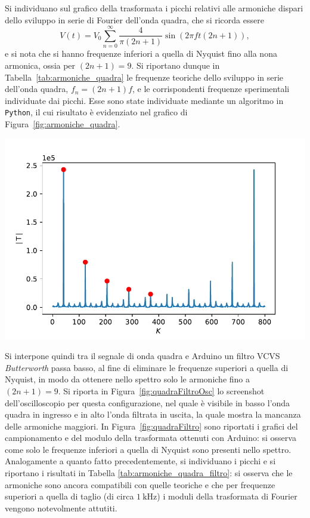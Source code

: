 \documentclass[10pt,oneside,a4paper]{article}
\newenvironment{Figure}
  {\par\medskip\noindent\minipage{\linewidth}}
  {\endminipage\par\medskip}
\begin{document}
\begin{multicols}{2}
Si individuano sul grafico della trasformata i picchi relativi alle armoniche dispari dello sviluppo in serie di Fourier dell'onda quadra, che si ricorda essere
\[
V(t) = V_0 \sum_{n=0}^{\infty} \frac{4}{\pi(2n+1)} \sin(2\pi f t(2n+1)), 
\]
e si nota che si hanno frequenze inferiori a quella di Nyquist fino alla nona armonica, ossia per $(2n+1) = 9$. Si riportano dunque in Tabella~\ref{tab:armoniche_quadra} le frequenze teoriche dello sviluppo in serie dell'onda quadra, $f_n = (2n+1)f$, e le corrispondenti frequenze sperimentali individuate dai picchi. Esse sono state individuate mediante un algoritmo in \texttt{Python}, il cui risultato è evidenziato nel grafico di Figura~\ref{fig:armoniche_quadra}.

\begin{Figure}
	\begin{center}
	\includegraphics[width=\linewidth]{rumore_analisi.pdf}
	\label{fig:armoniche_quadra}
	\end{center}
\end{Figure}


Si interpone quindi tra il segnale di onda quadra e Arduino un filtro VCVS \emph{Butterworth} passa basso, al fine di eliminare le frequenze superiori a quella di Nyquist, in modo da ottenere nello spettro solo le armoniche fino a $(2n+1)=9$. Si riporta in Figura~\ref{fig:quadraFiltroOsc} lo screenshot dell'oscilloscopio per questa configurazione, nel quale è visibile in basso l'onda quadra in ingresso e in alto l'onda filtrata in uscita, la quale mostra la mancanza delle armoniche maggiori. In Figura~\ref{fig:quadraFiltro} sono riportati i grafici del campionamento e del modulo della trasformata ottenuti con Arduino: si osserva come solo le frequenze inferiori a quella di Nyquist sono presenti nello spettro.
Analogamente a quanto fatto precedentemente, si individuano i picchi e si riportano i risultati in Tabella \ref{tab:armoniche_quadra_filtro}: si osserva che le armoniche sono ancora compatibili con quelle teoriche e che per frequenze superiori a quella di taglio (di circa $\SI{1}{\kilo\hertz}$) i moduli della trasformata di Fourier vengono notevolmente attutiti.


\end{multicols}
\end{document}
